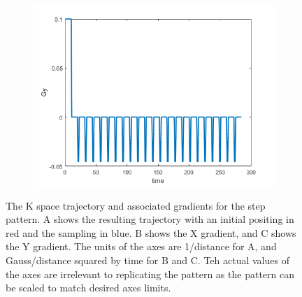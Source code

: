 \documentclass[12pt]{article}
\begin{document}
\begin{figure}[H]
\begin{subfigure}{0.3\textwidth}
	\includegraphics[width=\textwidth]{Figures/StepGy.png}
	\caption{}
	\label{Fig:stepGy}
\end{subfigure}
\caption{The K space trajectory and associated gradients for the step pattern. A shows the resulting trajectory with an initial positing in red and the sampling in blue. B shows the X gradient, and C shows the Y gradient. The units of the axes are 1/distance for A, and Gauss/distance squared by time for B and C. Teh actual values of the axes are irrelevant to replicating the pattern as the pattern can be scaled to match desired axes limits.}
\label{fig:step}
\end{figure}
\end{document}
